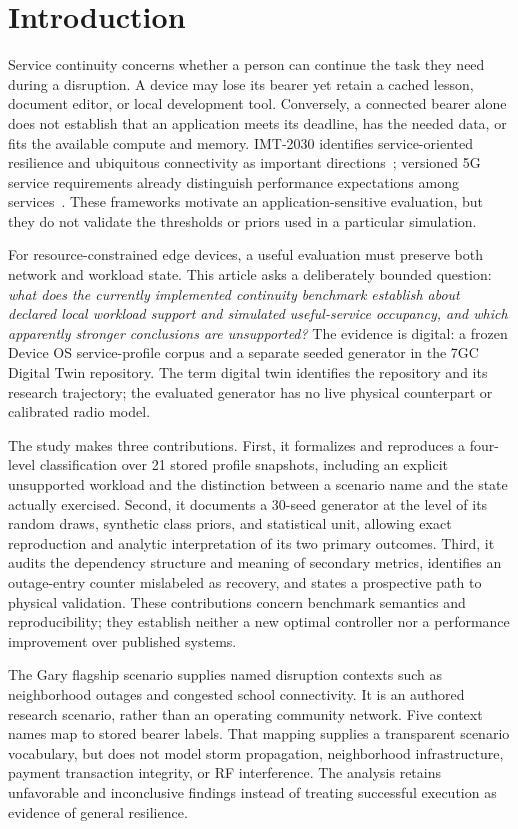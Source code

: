 \section{Introduction}
\label{sec:intro}
Service continuity concerns whether a person can continue the task they need during a disruption. A device may lose its bearer yet retain a cached lesson, document editor, or local development tool. Conversely, a connected bearer alone does not establish that an application meets its deadline, has the needed data, or fits the available compute and memory. IMT-2030 identifies service-oriented resilience and ubiquitous connectivity as important directions~\cite{itur_m2160}; versioned 5G service requirements already distinguish performance expectations among services~\cite{3gpp_ts22261}. These frameworks motivate an application-sensitive evaluation, but they do not validate the thresholds or priors used in a particular simulation.

For resource-constrained edge devices, a useful evaluation must preserve both network and workload state. This article asks a deliberately bounded question: \emph{what does the currently implemented continuity benchmark establish about declared local workload support and simulated useful-service occupancy, and which apparently stronger conclusions are unsupported?} The evidence is digital: a frozen Device OS service-profile corpus and a separate seeded generator in the 7GC Digital Twin repository. The term digital twin identifies the repository and its research trajectory; the evaluated generator has no live physical counterpart or calibrated radio model.

The study makes three contributions. First, it formalizes and reproduces a four-level classification over 21 stored profile snapshots, including an explicit unsupported workload and the distinction between a scenario name and the state actually exercised. Second, it documents a 30-seed generator at the level of its random draws, synthetic class priors, and statistical unit, allowing exact reproduction and analytic interpretation of its two primary outcomes. Third, it audits the dependency structure and meaning of secondary metrics, identifies an outage-entry counter mislabeled as recovery, and states a prospective path to physical validation. These contributions concern benchmark semantics and reproducibility; they establish neither a new optimal controller nor a performance improvement over published systems.

The Gary flagship scenario supplies named disruption contexts such as neighborhood outages and congested school connectivity. It is an authored research scenario, rather than an operating community network. Five context names map to stored bearer labels. That mapping supplies a transparent scenario vocabulary, but does not model storm propagation, neighborhood infrastructure, payment transaction integrity, or RF interference. The analysis retains unfavorable and inconclusive findings instead of treating successful execution as evidence of general resilience.

